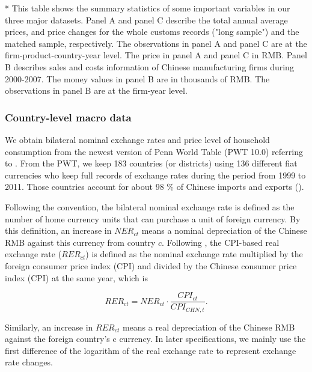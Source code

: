 \documentclass[12pt]{article}
\begin{document}
\begin{table}[htbp]
{\begin{threeparttable}
\begin{tabular}{lcccccc}
		\bottomrule
	\end{tabular}
	\begin{tablenotes}
		\footnotesize
		\item[*] This table shows the summary statistics of some important variables in our three major datasets. Panel A and panel C describe the total annual average prices, and price changes for the whole customs records ("long sample") and the matched sample, respectively. The observations in panel A and panel C are at the firm-product-country-year level. The price in panel A and panel C in RMB. Panel B describes sales and costs information of Chinese manufacturing firms during 2000-2007. The money values in panel B are in thousands of RMB. The observations in panel B are at the firm-year level.
	\end{tablenotes}
	\end{threeparttable}
        }
\end{table}

\subsubsection{Country-level macro data} \label{Data-Macro}

We obtain bilateral nominal exchange rates and price level of household consumption from the newest version of Penn World Table (PWT 10.0) referring to \cite{feenstra2015}. From the PWT, we keep 183 countries (or districts) using 136 different fiat currencies who keep full records of exchange rates during the period from 1999 to 2011. Those countries account for about 98 \% of Chinese imports and exports (\cite{xu-guo2021}).

Following the convention, the bilateral nominal exchange rate is defined as the number of home currency units that can purchase a unit of foreign currency. By this definition, an increase in $NER_{ct}$ means a nominal depreciation of the Chinese RMB against this currency from country $c$. Following \cite{lmx2015}, the CPI-based real exchange rate ($RER_{ct}$) is defined as the nominal exchange rate multiplied by the foreign consumer price index (CPI) and divided by the Chinese consumer price index (CPI) at the same year, which is

$$
RER_{ct}=NER_{ct} \cdot \frac{CPI_{ct}}{CPI_{CHN,t}}.
$$

Similarly, an increase in $RER_{ct}$ means a real depreciation of the Chinese RMB against the foreign country's c currency. In later specifications, we mainly use the first difference of the logarithm of the real exchange rate to represent exchange rate changes.
\end{document}
